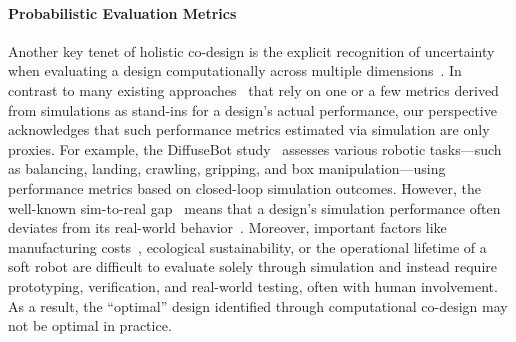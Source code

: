 \paragraph{Probabilistic Evaluation Metrics}
Another key tenet of holistic co-design is the explicit recognition of uncertainty when evaluating a design computationally across multiple dimensions~\citep{chen2020design}. In contrast to many existing approaches~\citep{wang2024diffusebot} that rely on one or a few metrics derived from simulations as stand-ins for a design’s actual performance, our perspective acknowledges that such performance metrics estimated via simulation are only proxies. For example, the DiffuseBot study~\citep{wang2024diffusebot} assesses various robotic tasks—such as balancing, landing, crawling, gripping, and box manipulation—using performance metrics based on closed-loop simulation outcomes. However, the well-known sim-to-real gap~\citep{dubied2022sim} means that a design’s simulation performance often deviates from its real-world behavior~\citep{junge2022leveraging}. Moreover, important factors like manufacturing costs~\citep{junge2022leveraging}, ecological sustainability, or the operational lifetime of a soft robot are difficult to evaluate solely through simulation and instead require prototyping, verification, and real-world testing, often with human involvement. As a result, the “optimal” design identified through computational co-design may not be optimal in practice.

